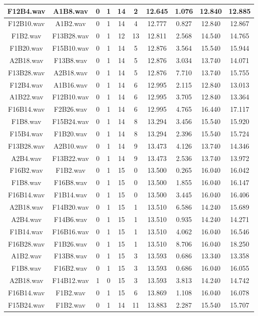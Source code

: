 \documentclass[11pt,a4paper]{book}
\begin{document}
\begin{longtable}[c]{|c|c|c|c|c|c|c|c|c|c|}
F12B4.wav&A1B8.wav&0&1&14&2&12.645&1.076&12.840&12.885\\ \hline
F12B10.wav&A1B2.wav&0&1&14&4&12.777&0.827&12.840&12.867\\ \hline
F1B2.wav&F13B28.wav&0&1&12&13&12.811&2.568&14.540&14.765\\ \hline
F1B20.wav&F15B10.wav&0&1&14&5&12.876&3.564&15.540&15.944\\ \hline
A2B18.wav&F13B8.wav&0&1&14&5&12.876&3.034&13.740&14.071\\ \hline
F13B28.wav&A2B18.wav&0&1&14&5&12.876&7.710&13.740&15.755\\ \hline
F12B4.wav&A1B16.wav&0&1&14&6&12.995&2.115&12.840&13.013\\ \hline
A1B22.wav&F12B10.wav&0&1&14&6&12.995&3.705&12.840&13.364\\ \hline
F16B14.wav&F2B26.wav&0&1&14&6&12.995&4.765&16.440&17.117\\ \hline
F1B8.wav&F15B24.wav&0&1&14&8&13.294&3.456&15.540&15.920\\ \hline
F15B4.wav&F1B20.wav&0&1&14&8&13.294&2.396&15.540&15.724\\ \hline
F13B28.wav&A2B10.wav&0&1&14&9&13.473&4.126&13.740&14.346\\ \hline
A2B4.wav&F13B22.wav&0&1&14&9&13.473&2.536&13.740&13.972\\ \hline
F16B2.wav&F1B2.wav&0&1&15&0&13.500&0.265&16.040&16.042\\ \hline
F1B8.wav&F16B8.wav&0&1&15&0&13.500&1.855&16.040&16.147\\ \hline
F16B14.wav&F1B14.wav&0&1&15&0&13.500&3.445&16.040&16.406\\ \hline
A2B18.wav&F14B20.wav&0&1&15&1&13.510&6.586&14.240&15.689\\ \hline
A2B4.wav&F14B6.wav&0&1&15&1&13.510&0.935&14.240&14.271\\ \hline
F1B14.wav&F16B16.wav&0&1&15&1&13.510&4.062&16.040&16.546\\ \hline
F16B28.wav&F1B26.wav&0&1&15&1&13.510&8.706&16.040&18.250\\ \hline
A1B2.wav&F13B8.wav&0&1&15&3&13.593&0.686&13.340&13.358\\ \hline
F1B8.wav&F16B2.wav&0&1&15&3&13.593&0.686&16.040&16.055\\ \hline
A2B18.wav&F14B12.wav&1&0&15&3&13.593&3.813&14.240&14.742\\ \hline
F16B14.wav&F1B2.wav&0&1&15&6&13.869&1.108&16.040&16.078\\ \hline
F15B24.wav&F1B2.wav&0&1&14&11&13.883&2.287&15.540&15.707\\ \hline

\end{longtable}
\end{document}
